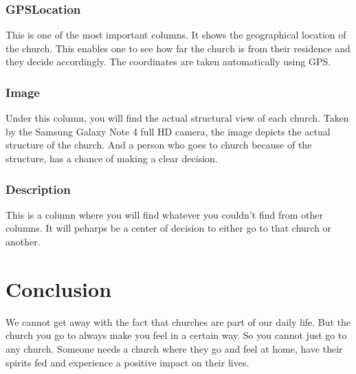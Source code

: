 \documentclass[11pt, oneside]{article}   	%
\begin{document}
\subsubsection{GPSLocation}
This is one of the most important columns. It shows the geographical location of the church. This enables one to see how far the church is from their residence and they decide accordingly. The coordinates are taken automatically using GPS.
\subsubsection{Image}
Under this column, you will find the actual structural view of each church. Taken by the Samsung Galaxy Note 4 full HD camera, the image depicts the actual structure of the church. And a person who goes to church because of the structure, has a chance of making a clear decision.
\subsubsection{Description}
This is a column where you will find whatever you couldn't find from other columns. It will peharps  be a center of decision to either go to that church or another.
\section{Conclusion}
We cannot get away with the fact that churches are part of our daily life. But the church you go to always make you feel in a certain way. So you cannot just go to any church. Someone needs a church where they go and feel at home, have their spirits fed and experience a positive impact on their lives.
\end{document}
